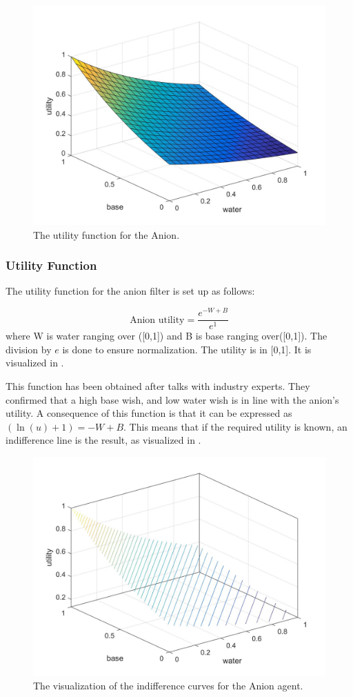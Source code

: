 \begin{figure}[h]
	\centering
	\includegraphics[width=0.7\linewidth]{img/Anion_utility}
	\caption{The utility function for the Anion.}
	\label{fig:anionutility}
\end{figure}

\subsubsection{Utility Function}
The utility function for the anion filter is set up as follows:

\[
\text{Anion utility} = \frac{e^{-W+B}}{e^1}
\]
where W is water ranging over ([0,1]) and B is base ranging over([0,1]). The division by $e$ is done to ensure normalization. The utility is in [0,1]. It is visualized in .

This function has been obtained after talks with industry experts. They confirmed that a high base wish, and low water wish is in line with the anion's utility. A consequence of this function is that it can be expressed as $ (\ln(u)+1) = -W+B$. This means that if the required utility is known, an indifference line is the result, as visualized in .

\begin{figure}[h]
	\centering
	\includegraphics[width=0.7\linewidth]{img/Anion_utility_contour}
	\caption{The visualization of the indifference curves for the Anion agent.}
	\label{fig:anionutilitycontour}
\end{figure}

